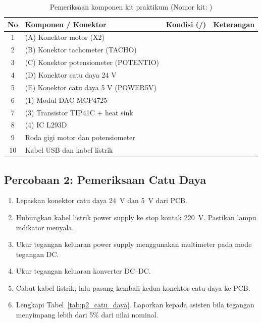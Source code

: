 \documentclass[11pt,a4paper]{article}
\begin{document}
\begin{table}[H]
	\centering
	\caption{Pemeriksaan komponen kit praktikum (Nomor kit: \underline{\hspace{1.5cm}})}
	\label{tab:p1_komponen}
	\begin{tabularx}{\textwidth}{|c|X|c|X|}
		\hline
		\textbf{No} & \textbf{Komponen / Konektor}    & \textbf{Kondisi (\checkmark/\texttimes)} & \textbf{Keterangan} \\
		\hline
		1           & (A) Konektor motor (X2)         &                    &                     \\
		2           & (B) Konektor tachometer (TACHO) &                    &                     \\
		3           & (C) Konektor potensiometer (POTENTIO) &              &                     \\
		4           & (D) Konektor catu daya 24 V     &                    &                     \\
		5           & (E) Konektor catu daya 5 V (POWER5V) &               &                     \\
		6           & (1) Modul DAC MCP4725           &                    &                     \\
		7           & (3) Transistor TIP41C + heat sink &                  &                     \\
		8           & (4) IC L293D                    &                    &                     \\
		9           & Roda gigi motor dan potensiometer &                  &                     \\
		10          & Kabel USB dan kabel listrik     &                    &                     \\
		\hline
	\end{tabularx}
\end{table}

\subsection{Percobaan 2: Pemeriksaan Catu Daya}
\begin{enumerate}
	\item Lepaskan konektor catu daya 24~V dan 5~V dari PCB.
	\item Hubungkan kabel listrik power supply ke stop kontak 220~V. Pastikan lampu indikator menyala.
	\item Ukur tegangan keluaran power supply menggunakan multimeter pada mode tegangan DC.
	\item Ukur tegangan keluaran konverter DC--DC.
	\item Cabut kabel listrik, lalu pasang kembali kedua konektor catu daya ke PCB.
	\item Lengkapi Tabel~\ref{tab:p2_catu_daya}. Laporkan kepada asisten bila tegangan menyimpang lebih dari 5\% dari nilai nominal.
\end{enumerate}
\end{document}
